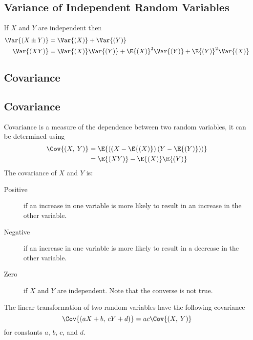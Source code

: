 \documentclass{article}
\begin{document}
\begin{multicols}{3}
    \subsection{Variance of Independent Random Variables}
    If \(X\) and \(Y\) are independent then
    \begin{align*}
        \Var{\left( X \pm Y \right)} & = \Var{\left( X \right)} + \Var{\left( Y \right)}                                                                                               \\
        \Var{\left( XY \right)}      & = \Var{\left( X \right)} \Var{\left( Y \right)} + \E{\left( X \right)}^2 \Var{\left( Y \right)} + \E{\left( Y \right)}^2 \Var{\left( X \right)}
    \end{align*}
    \subsection{Covariance}
    \subsection{Covariance}
    Covariance is a measure of the dependence between two random variables, it can be determined using
    \begin{align*}
        \Cov{\left( X,\: Y \right)} & = \E{\left( \left( X - \E{\left( X \right)} \right) \left( Y - \E{\left( Y \right)} \right) \right)} \\
                                    & = \E{\left( XY \right)} - \E{\left( X \right)} \E{\left( Y \right)}
    \end{align*}
    The covariance of \(X\) and \(Y\) is:
    \begin{description}
        \item[Positive] if an increase in one variable is more likely to result in an increase in
            the other variable.
        \item[Negative] if an increase in one variable is more likely to result in a decrease in
            the other variable.
        \item[Zero] if \(X\) and \(Y\) are independent. Note that the converse is not true.
    \end{description}
    The linear transformation of two random variables have the following covariance
    \begin{equation*}
        \Cov{\left( aX + b,\: cY + d \right)} = ac \Cov{\left( X,\: Y \right)}
    \end{equation*}
    for constants \(a\), \(b\), \(c\), and \(d\).

\end{multicols}
\end{document}
